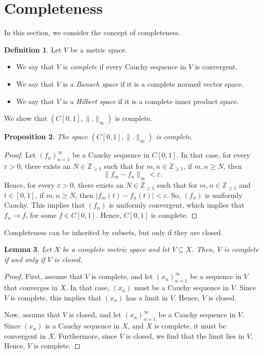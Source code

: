 \documentclass[a4paper, openany]{memoir}
\theoremstyle{definition}
\newtheorem{definition}{Definition}[section]
\theoremstyle{plain}
\newtheorem{lemma}[definition]{Lemma}
\newtheorem{proposition}[definition]{Proposition}
\begin{document}
    \section{Completeness}
    In this section, we consider the concept of completeness.
    \begin{definition}
        Let $V$ be a metric space.
        \begin{itemize}
            \item We say that $V$ is \emph{complete} if every Cauchy sequence in $V$ is convergent.
            \item We say that $V$ is a \emph{Banach space} if it is a complete normed vector space.
            \item We say that $V$ is a \emph{Hilbert space} if it is a complete inner product space.
        \end{itemize}
    \end{definition}
    \noindent We show that $(C[0, 1], \lVert . \rVert_\infty)$ is complete.
    \begin{proposition}
        The space $(C[0, 1], \lVert . \rVert_\infty)$ is complete.
    \end{proposition}
    \begin{proof}
        Let $(f_n)_{n=1}^\infty$ be a Cauchy sequence in $C[0, 1]$. In that case, for every $\varepsilon > 0$, there exists an $N \in \mathbb{Z}_{\geq 1}$ such that for $m, n \in \mathbb{Z}_{\geq 1}$, if $m, n \geq N$, then 
        \[\lVert f_m - f_n \rVert_\infty < \varepsilon.\]
        Hence, for every $\varepsilon > 0$, there exists an $N \in \mathbb{Z}_{\geq 1}$ such that for $m, n \in \mathbb{Z}_{\geq 1}$ and $t \in [0, 1]$, if $m, n \geq N$, then $|f_m(t) - f_n(t)| < \varepsilon$. So, $(f_n)$ is uniformly Cauchy. This implies that $(f_n)$ is uniformly convergent, which implies that $f_n \to f$, for some $f \in C[0, 1]$. Hence, $C[0, 1]$ is complete.
    \end{proof}

    Completeness can be inherited by subsets, but only if they are closed.
    \begin{lemma}
        Let $X$ be a complete metric space and let $V \subseteq X$. Then, $V$ is complete if and only if $V$ is closed.
    \end{lemma}
    \begin{proof}
        First, assume that $V$ is complete, and let $(x_n)_{n=1}^\infty$ be a sequence in $V$ that converges in $X$. In that case, $(x_n)$ must be a Cauchy sequence in $V$. Since $V$ is complete, this implies that $(x_n)$ has a limit in $V$. Hence, $V$ is closed.

        Now, assume that $V$ is closed, and let $(x_n)_{n=1}^\infty$ be a Cauchy sequence in $V$. Since $(x_n)$ is a Cauchy sequence in $X$, and $X$ is complete, it must be convergent in $X$. Furthermore, since $V$ is closed, we find that the limit lies in $V$. Hence, $V$ is complete.
    \end{proof}
\end{document}
